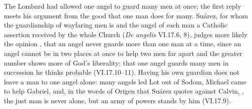 The Lombard had allowed one angel to guard many men at once; the first
reply meets his argument from the good that one man does for many. Suárez,
for whom the guardianship of wayfaring men is  and the
angel of each man a Catholic assertion received by the whole Church
(\emph{De angelis} VI.17.6, 8), judges more likely the opinion , that an angel never
guards more than one man at a time, since an angel cannot be
in two places at once to help two men far apart and the greater number shows
more of God's liberality; that one angel guards many men in succession he
thinks probable (VI.17.10--11). Having his own guardian does not leave a man to
one angel alone: many angels led Lot out of Sodom, Michael came to help
Gabriel, and, in the words of Origen that Suárez quotes against Calvin,
, the just man is never alone, but an army of powers stands by him
(VI.17.9).

